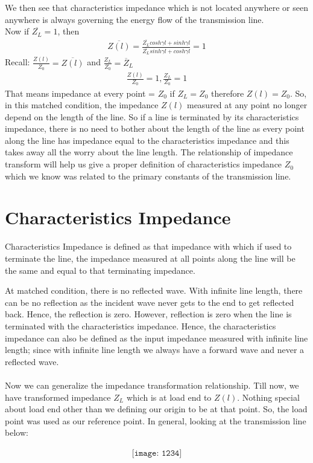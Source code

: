 We then see that characteristics impedance which is not located anywhere or seen anywhere is always governing the energy flow of the transmission line.\\
Now if $\overline{Z_L} = 1$, then \begin{align*}
\overline{Z(l)} = {\frac{\overline{Z_L}cosh\gamma l + sinh\gamma l}{\overline{Z_L}sinh\gamma l + cosh\gamma l}} = 1
\end{align*}
Recall: $\frac{Z(l)}{Z_0} = \overline{Z(l)}$ and $\frac{Z_L}{Z_0} = \overline{Z}_L$\\
\begin{align*}
\frac{Z(l)}{Z_0} = 1,\frac{Z_L}{Z_0} = 1
\end{align*}
That means impedance at every point = $Z_0$ if $Z_L = Z_0$ therefore $Z(l) = Z_0$. So, in this matched condition, the impedance $Z(l)$ measured at any point no longer depend on the length of the line. So if a line is terminated by its characteristics impedance, there is no need to bother about the length of the line as every point along the line has impedance equal to the characteristics impedance and this takes away all the worry about the line length.
The relationship of impedance transform will help us give a proper definition of characteristics impedance $Z_0$ which we know was related to the primary constants of the transmission line.
\section{Characteristics Impedance}  
Characteristics Impedance is defined as that impedance with which if used to terminate the line, the impedance measured at all points along the line will be the same and equal to that terminating impedance.


At matched condition, there is no reflected wave. With infinite line length, there can be no reflection as the incident wave never gets to the end to get reflected back. Hence, the reflection is zero. However, reflection is zero when the line is terminated with the characteristics impedance. Hence, the characteristics impedance can also be defined as the input impedance measured with infinite line length; since with infinite line length we always have a forward wave and never a reflected wave.\\\\
Now we can generalize the impedance transformation relationship. Till now, we have transformed impedance $Z_L$ which is at load end to $Z(l)$. Nothing special about load end other than we defining our origin to be at that point. So, the load point was used as our reference point. In general, looking at the transmission line below:
\begin{figure}[h]
\begin{align*}
\texttt{[image: 1234]}
\end{align*}
\end{figure}


